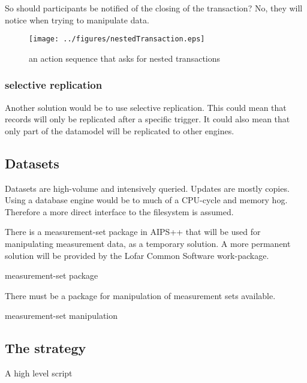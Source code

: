 \documentclass[]{lofar}
\begin{document}
        So should participants be notified of the closing of the
        transaction?  No, they will notice when trying to manipulate
        data.

        \begin{figure}
          \texttt{[image: ../figures/nestedTransaction.eps]}
          \hypertarget{fig:nestedTransaction}{}
          \caption{an action sequence that asks for nested transactions\label{fig:nestedTransactions}}
        \end{figure}

      \subsubsection{selective replication}
      \label{subsubsec:selective-replication}\hypertarget{subsubsec:selective-replication}{}%

        Another solution would be to use selective replication. This
        could mean that records will only be replicated after a
        specific trigger. It could also mean that only part of the
        datamodel will be replicated to other engines.

    \subsection{Datasets}
    \label{subsec:Datasets}\hypertarget{subsec:Datasets}{}%

      Datasets are high-volume and intensively queried. Updates are
      mostly copies. Using a database engine would be to much of a
      CPU-cycle and memory hog. Therefore a more direct interface to
      the filesystem is assumed.

      \begin{assumption}
        There is a measurement-set package in AIPS++ that will be used
        for manipulating measurement data, as a temporary solution. A
        more permanent solution will be provided by the Lofar Common
        Software work-package.
        \caption{measurement-set package\label{ass:aips++}}
      \end{assumption}

      \begin{prerequisite}
        There must be a package for manipulation of measurement sets available.
        \caption{measurement-set manipulation\label{pre:aips++}}
      \end{prerequisite}

    \subsection{The strategy}{A high level script}
    \label{subsec:strategy}\hypertarget{subsec:strategy}{}
\end{document}
